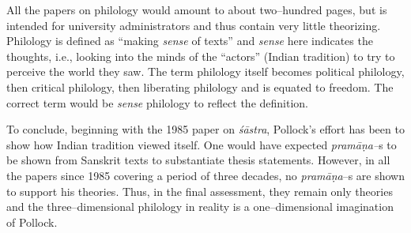 All the papers on philology would amount to about two–hundred pages, but is intended for university administrators and thus contain very little theorizing. Philology is defined as “making \textit{sense} of texts” and \textit{sense} here indicates the thoughts, i.e., looking into the minds of the “actors” (Indian tradition) to try to perceive the world they saw. The term philology itself becomes political philology, then critical philology, then liberating philology and is equated to freedom. The correct term would be \textit{sense} philology to reflect the definition.

To conclude, beginning with the 1985 paper on \textit{śāstra}, Pollock’s effort has been to show how Indian tradition viewed itself. One would have expected \textit{pramāṇa–}s to be shown from Sanskrit texts to substantiate thesis statements. However, in all the papers since 1985 covering a period of three decades, no \textit{pramāṇa}–s are shown to support his theories. Thus, in the final assessment, they remain only theories and the three–dimensional philology in reality is a one–dimensional imagination of Pollock.

